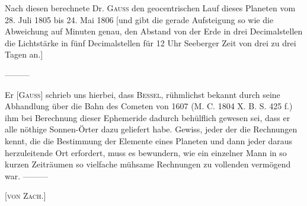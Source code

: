 \indent Nach diesen berechnete Dr. \textsc{Gauss} den geocentrischen Lauf dieses Planeten vom 28. Juli 1805 bis
24. Mai 1806 [und gibt die gerade Aufsteigung so wie die Abweichung auf Minuten genau, den Abstand
von der Erde in drei Decimalstellen die Lichtstärke in fünf Decimalstellen für 12 Uhr Seeberger Zeit
von drei zu drei Tagen an.]

—\quad—\quad—

Er [\textsc{Gauss}] schrieb uns hierbei, dass \textsc{Bessel}, rühmlichst bekannt durch seine Abhandlung über
die Bahn des Cometen von 1607 (M. C. 1804 X. B. S. 425 f.) ihm bei Berechnung dieser Ephemeride dadurch
behülflich gewesen sei, dass er alle nöthige Sonnen-Örter dazu geliefert habe. Gewiss, jeder der
die Rechnungen kennt, die die Bestimmung der Elemente eines Planeten und dann jeder daraus herzuleitende
Ort erfordert, muss es bewundern, wie ein einzelner Mann in so kurzen Zeiträumen so vielfache
mühsame Rechnungen zu vollenden vermögend war. —\quad—\quad—

\hfill[\textsc{von Zach.}]

